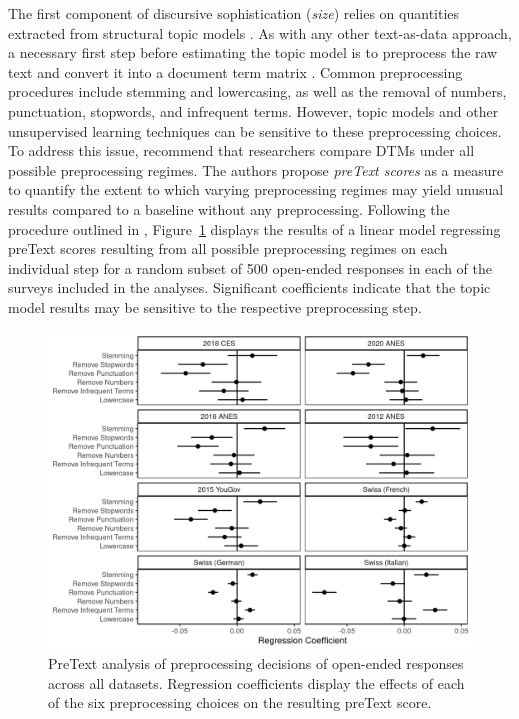 The first component of discursive sophistication (\textit{size}) relies on quantities extracted from structural topic models \citep{roberts2014structural}. As with any other text-as-data approach, a necessary first step before estimating the topic model is to preprocess the raw text and convert it into a document term matrix \citep[DTM, see for example][]{manning2008introduction}. Common preprocessing procedures include stemming and lowercasing, as well as the removal of numbers, punctuation, stopwords, and infrequent terms. However, topic models and other unsupervised learning techniques can be sensitive to these preprocessing choices. To address this issue, \citet{denny2018text} recommend that researchers compare DTMs under all possible preprocessing regimes. The authors propose \textit{preText scores} as a measure to quantify the extent to which varying preprocessing regimes may yield unusual results compared to a baseline without any preprocessing. Following the procedure outlined in \citet{denny2018text}, Figure~\ref{fig:pretext} displays the results of a linear model regressing preText scores resulting from all possible preprocessing regimes on each individual step for a random subset of 500 open-ended responses in each of the surveys included in the analyses. Significant coefficients indicate that the topic model results may be sensitive to the respective preprocessing step.

\begin{figure}[h]
\centering\includegraphics[scale=.9]{../fig/pretext.png}
    \caption[PreText analysis of preprocessing decisions of open-ended responses across all datasets]{PreText analysis of preprocessing decisions of open-ended responses across all datasets. Regression coefficients display the effects of each of the six preprocessing choices on the resulting preText score.}\label{fig:pretext}
\end{figure}


